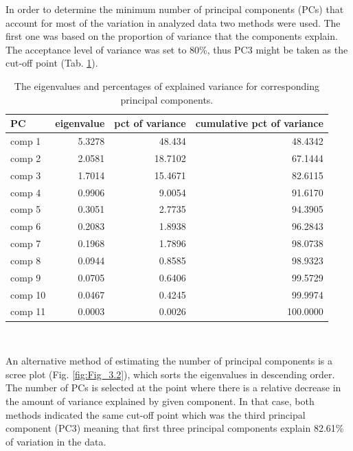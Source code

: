 \documentclass[12pt,a4paper,notitlepage]{report}
\begin{document}
In order to determine the minimum number of principal components (PCs) that account for most of the variation in analyzed data two methods were used. The first one was based on the proportion of variance that the components explain. The acceptance level of variance was set to 80\%, thus PC3 might be taken as the cut-off point (Tab. \ref{tab:Eigenvalues}).

\begin{table}[H]
\centering
	\begin{tabular}{lrrr}
	\hline \textbf{PC}  & \textbf{eigenvalue}	& \textbf{pct of variance} & \textbf{cumulative pct of variance}  \\
	\hline
	\hline
	comp 1		&	5.3278		&	48.434			&	48.4342\\
	comp 2		&	2.0581		&	18.7102			&	67.1444\\
	comp 3		&	1.7014		&	15.4671			&	82.6115\\
	\hdashline
	comp 4		&	0.9906		&	9.0054			&	91.6170\\
	comp 5		&	0.3051		&	2.7735			&	94.3905\\
	comp 6		&	0.2083		&	1.8938			&	96.2843\\
	comp 7		&	0.1968		&	1.7896			&	98.0738\\
	comp 8		&	0.0944		&	0.8585			&	98.9323\\
	comp 9		&	0.0705		&	0.6406			&	99.5729\\
	comp 10		&	0.0467		&	0.4245			&	99.9974\\
	comp 11		&	0.0003		&	0.0026			&	100.0000\\
	\hline
	\end{tabular} \\ 
	\caption{The eigenvalues and percentages of explained variance for corresponding principal components.}
	\label{tab:Eigenvalues}
\end{table}

An alternative method of estimating the number of principal components is a scree plot (Fig. \ref{fig:Fig_3.2}), which sorts the eigenvalues in descending order. The number of PCs is selected at the point where there is a relative decrease in the amount of variance explained by given component. In that case, both methods indicated the same cut-off point which was the third principal component (PC3) meaning that first three principal components explain 82.61\% of variation in the data.
\end{document}
